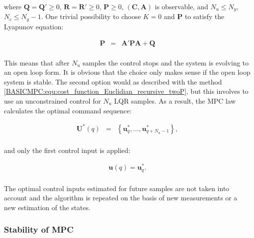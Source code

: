 		where $\textbf{Q}=\textbf{Q}'\geq0$, $\textbf{R}=\textbf{R}'\geq0$, $\textbf{P}\geq0$, $(\textbf{C},\textbf{A})$ is observable, and $N_u\leq N_y$, $N_c\leq N_y-1$. One trivial possibility to choose $K=0$ and $\textbf{P}$ to satisfy the Lyapunov equation:
		
		\begin{equation}
        \begin{array}{rcl}
				\textbf{P}&=&\textbf{A}'\textbf{PA}+\textbf{Q}\\
        \end{array}
        \label{BASICMPC:equ:receiding_horison_Lyapunov}
    \end{equation}
		
		This means that after $N_u$ samples the control stops and the system is evolving to an open loop form. It is obvious that the choice only makes sense if the open loop system is stable. The second option would as described with the method \ref{BASICMPC:equ:cost_function_Euclidian_recursive_twoP}, but this involves to use an unconstrained control for $N_u$ LQR samples. As a result, the MPC law calculates the optimal command sequence:
		
		\begin{equation}
        \begin{array}{rcl}
				\textbf{U}^*(q)&=&\left\{\textbf{u}^*_q,\dots,\textbf{u}^*_{q+N_u-1}\right\},\\
        \end{array}
        \label{BASICMPC:equ:receiding_optimal_sequence}
    \end{equation}
		
		and only the first control input is applied:
		
		\begin{equation}
        \begin{array}{rcl}
				\textbf{u}(q)=\textbf{u}^*_q.\\
        \end{array}
        \label{BASICMPC:equ:receiding_optimal_first}
    \end{equation}
		
		The optimal control inputs estimated for future samples are not taken into account and the algorithm is
repeated on the basis of new measurements or a new estimation of the states.	

    \subsubsection{Stability of MPC}\label{BASICCSR:sec:MPCStability}

